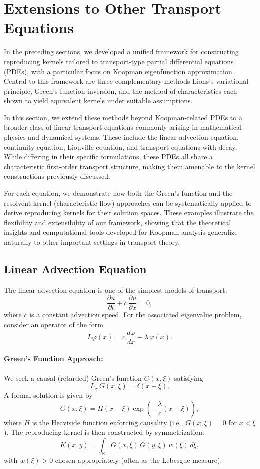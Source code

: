 \documentclass[11pt]{article}
\theoremstyle{plain}
\def\[{\begin{equation}}
\def\]{\end{equation}}
\begin{document}
\section{Extensions to Other Transport Equations}

In the preceding sections, we developed a unified framework for constructing reproducing kernels tailored to transport-type partial differential equations (PDEs), with a particular focus on Koopman eigenfunction approximation. Central to this framework are three complementary methods-Lions’s variational principle, Green’s function inversion, and the method of characteristics-each shown to yield equivalent kernels under suitable assumptions.

In this section, we extend these methods beyond Koopman-related PDEs to a broader class of linear transport equations commonly arising in mathematical physics and dynamical systems. These include the linear advection equation, continuity equation, Liouville equation, and transport equations with decay. While differing in their specific formulations, these PDEs all share a characteristic first-order transport structure, making them amenable to the kernel constructions previously discussed.

For each equation, we demonstrate how both the Green’s function and the resolvent kernel (characteristic flow) approaches can be systematically applied to derive reproducing kernels for their solution spaces. These examples illustrate the flexibility and extensibility of our framework, showing that the theoretical insights and computational tools developed for Koopman analysis generalize naturally to other important settings in transport theory.
 

\subsection{Linear Advection Equation}

The linear advection equation is one of the simplest models of transport:
\[
\frac{\partial u}{\partial t} + c\,\frac{\partial u}{\partial x} = 0,
\]
where \(c\) is a constant advection speed. For the associated eigenvalue problem, consider an operator of the form
\[
L\varphi(x)= c\,\frac{d\varphi}{dx} - \lambda\, \varphi(x).
\]

\paragraph{Green's Function Approach:}  
We seek a causal (retarded) Green's function \(G(x,\xi)\) satisfying
\[
L_x\,G(x,\xi)= \delta(x-\xi).
\]
A formal solution is given by
\[
G(x,\xi) = H(x-\xi) \exp\!\left(-\frac{\lambda}{c}(x-\xi)\right),
\]
where \(H\) is the Heaviside function enforcing causality (i.e., \(G(x,\xi)=0\) for \(x<\xi\)). The reproducing kernel is then constructed by symmetrization:
\[
K(x,y)= \int_{\mathbb{R}} G(x,\xi)\,G(y,\xi)\,w(\xi)\,d\xi,
\]
with \(w(\xi) > 0\) chosen appropriately (often as the Lebesgue measure).
\end{document}
